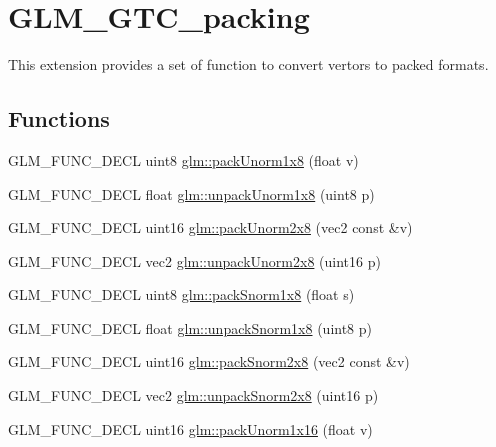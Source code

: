 \hypertarget{group__gtc__packing}{\section{G\-L\-M\-\_\-\-G\-T\-C\-\_\-packing}
\label{group__gtc__packing}
}


This extension provides a set of function to convert vertors to packed formats.  


\subsection*{Functions}
\begin{DoxyCompactItemize}
\item 
G\-L\-M\-\_\-\-F\-U\-N\-C\-\_\-\-D\-E\-C\-L uint8 \hyperlink{group__gtc__packing_ga2f9963e5d762b10085b280d3662017ba}{glm\-::pack\-Unorm1x8} (float v)
\item 
G\-L\-M\-\_\-\-F\-U\-N\-C\-\_\-\-D\-E\-C\-L float \hyperlink{group__gtc__packing_ga32f3f2642df2ea87449d59fb614a8305}{glm\-::unpack\-Unorm1x8} (uint8 p)
\item 
G\-L\-M\-\_\-\-F\-U\-N\-C\-\_\-\-D\-E\-C\-L uint16 \hyperlink{group__gtc__packing_ga833288fc0d4a79f19d0db75a6843bfe6}{glm\-::pack\-Unorm2x8} (vec2 const \&v)
\item 
G\-L\-M\-\_\-\-F\-U\-N\-C\-\_\-\-D\-E\-C\-L vec2 \hyperlink{group__gtc__packing_ga96ce0c24339ee676e28a027fffd1edf6}{glm\-::unpack\-Unorm2x8} (uint16 p)
\item 
G\-L\-M\-\_\-\-F\-U\-N\-C\-\_\-\-D\-E\-C\-L uint8 \hyperlink{group__gtc__packing_ga26b6cd7a35c46c4b6a342f3b97b47423}{glm\-::pack\-Snorm1x8} (float s)
\item 
G\-L\-M\-\_\-\-F\-U\-N\-C\-\_\-\-D\-E\-C\-L float \hyperlink{group__gtc__packing_ga6f2bebf536fbf7c8b97d4b306bb3354e}{glm\-::unpack\-Snorm1x8} (uint8 p)
\item 
G\-L\-M\-\_\-\-F\-U\-N\-C\-\_\-\-D\-E\-C\-L uint16 \hyperlink{group__gtc__packing_ga05d08a82923166ec7cd5d0e6154c9953}{glm\-::pack\-Snorm2x8} (vec2 const \&v)
\item 
G\-L\-M\-\_\-\-F\-U\-N\-C\-\_\-\-D\-E\-C\-L vec2 \hyperlink{group__gtc__packing_ga27f30f0281b88e152b0895f5e2ead878}{glm\-::unpack\-Snorm2x8} (uint16 p)
\item 
G\-L\-M\-\_\-\-F\-U\-N\-C\-\_\-\-D\-E\-C\-L uint16 \hyperlink{group__gtc__packing_ga60c7d915f5653559ae02c2f79a8c5c1d}{glm\-::pack\-Unorm1x16} (float v)
\item 

\end{DoxyCompactItemize}
